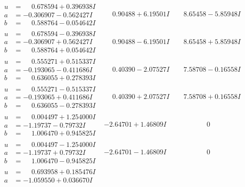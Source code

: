 \documentclass[1p]{elsarticle_modified}
\theoremstyle{definition}
\begin{document}
$$\begin{array}{c|c|c}
\begin{aligned}
u &= \phantom{-}0.678594 + 0.396938 I \\
a &= -0.306907 - 0.562427 I \\
b &= \phantom{-}0.588764 - 0.054642 I\end{aligned}
 & \phantom{-}0.90488 + 6.19501 I & \phantom{-}8.65458 - 5.85948 I \\ \hline\begin{aligned}
u &= \phantom{-}0.678594 - 0.396938 I \\
a &= -0.306907 + 0.562427 I \\
b &= \phantom{-}0.588764 + 0.054642 I\end{aligned}
 & \phantom{-}0.90488 - 6.19501 I & \phantom{-}8.65458 + 5.85948 I \\ \hline\begin{aligned}
u &= \phantom{-}0.555271 + 0.515337 I \\
a &= -0.193065 - 0.411686 I \\
b &= \phantom{-}0.636055 + 0.278393 I\end{aligned}
 & \phantom{-}0.40390 - 2.07527 I & \phantom{-}7.58708 - 0.16558 I \\ \hline\begin{aligned}
u &= \phantom{-}0.555271 - 0.515337 I \\
a &= -0.193065 + 0.411686 I \\
b &= \phantom{-}0.636055 - 0.278393 I\end{aligned}
 & \phantom{-}0.40390 + 2.07527 I & \phantom{-}7.58708 + 0.16558 I \\ \hline\begin{aligned}
u &= \phantom{-}0.004497 + 1.254000 I \\
a &= -1.19737 - 0.79732 I \\
b &= \phantom{-}1.006470 + 0.945825 I\end{aligned}
 & -2.64701 + 1.46809 I & \phantom{-0.000000 } 0 \\ \hline\begin{aligned}
u &= \phantom{-}0.004497 - 1.254000 I \\
a &= -1.19737 + 0.79732 I \\
b &= \phantom{-}1.006470 - 0.945825 I\end{aligned}
 & -2.64701 - 1.46809 I & \phantom{-0.000000 } 0 \\ \hline\begin{aligned}
u &= \phantom{-}0.693958 + 0.185476 I \\
a &= -1.059550 + 0.036670 I \\

\end{aligned}
\end{array}$$
\end{document}
